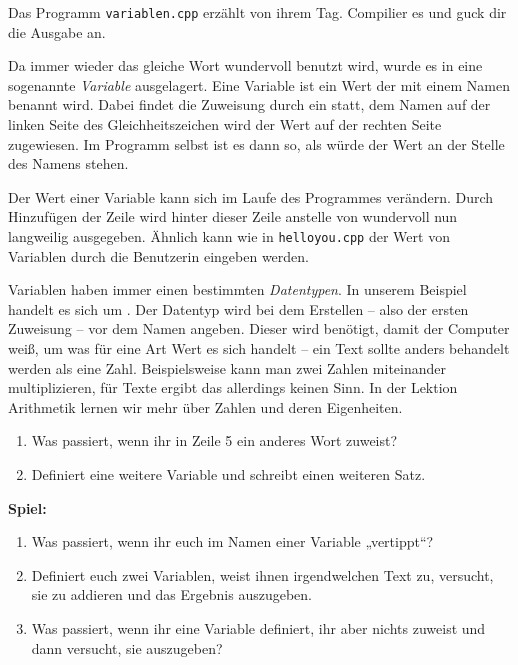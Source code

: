 
Das Programm \texttt{variablen.cpp} erzählt von ihrem Tag.
Compilier es und guck dir die Ausgabe an.


Da immer wieder das gleiche Wort \glqq{}wundervoll\grqq{} benutzt wird, wurde es in eine sogenannte \emph{Variable} ausgelagert.
Eine Variable ist ein Wert der mit einem Namen benannt wird.
Dabei findet die Zuweisung durch ein \cppinline{=} statt, dem Namen auf der linken Seite des Gleichheitszeichen wird der Wert auf der rechten Seite zugewiesen.
Im Programm selbst ist es dann so, als würde der Wert an der Stelle des Namens stehen.

Der Wert einer Variable kann sich im Laufe des Programmes verändern.
Durch Hinzufügen der Zeile  wird hinter dieser Zeile anstelle von \glqq{}wundervoll\grqq{} nun \glqq{}langweilig\grqq{} ausgegeben.
Ähnlich kann wie in \texttt{helloyou.cpp} der Wert von Variablen durch  die Benutzerin eingeben werden.

Variablen haben immer einen bestimmten \emph{Datentypen}.
In unserem Beispiel handelt es sich um .
Der Datentyp wird bei dem Erstellen -- also der ersten Zuweisung -- vor dem Namen angeben.
Dieser wird benötigt, damit der Computer weiß, um was für eine Art Wert es sich handelt -- ein Text sollte anders behandelt werden als eine Zahl.
Beispielsweise kann man zwei Zahlen miteinander multiplizieren, für Texte ergibt das allerdings keinen Sinn.
In der Lektion Arithmetik lernen wir mehr über Zahlen und deren Eigenheiten.

\begin{praxis}
    \begin{enumerate}
        \item Was passiert, wenn ihr  in Zeile 5 ein anderes Wort zuweist?
        \item Definiert eine weitere Variable und schreibt einen weiteren Satz.
    \end{enumerate}
\end{praxis}

\begin{spiel}
  \textbf{Spiel:}
  \begin{enumerate}
    \item Was passiert, wenn ihr euch im Namen einer Variable „vertippt“?
    \item Definiert euch zwei  Variablen, weist ihnen
        irgendwelchen Text zu, versucht, sie zu addieren und das Ergebnis auszugeben.
    \item Was passiert, wenn ihr eine  Variable definiert,
        ihr aber nichts zuweist und dann versucht, sie auszugeben?
  \end{enumerate}
\end{spiel}

